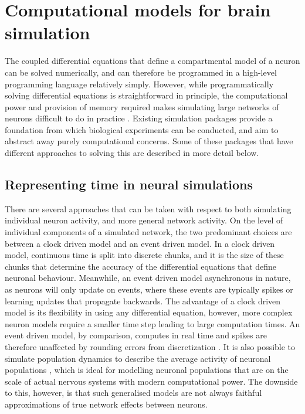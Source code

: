 

\section{Computational models for brain simulation}

The coupled differential equations that define a compartmental model of a neuron
can be solved numerically, and can therefore be programmed in a high-level
programming language relatively simply. However, while programmatically solving
differential equations is straightforward in principle, the computational power
and provision of memory required makes simulating large networks of neurons
difficult to do in practice \autocite{trappenberg_fundamentals_2009}. Existing
simulation packages provide a foundation from which biological experiments can
be conducted, and aim to abstract away purely computational concerns. Some of
these packages that have different approaches to solving this are described in
more detail below.

\subsection{Representing time in neural simulations}

There are several approaches that can be taken with respect to both simulating
individual neuron activity, and more general network activity. On the level of
individual components of a simulated network, the two predominant choices are
between a clock driven model and an event driven model. In a clock driven model,
continuous time is split into discrete chunks, and it is the size of these
chunks that determine the accuracy of the differential equations that define
neuronal behaviour. Meanwhile, an event driven model asynchronous in nature, as
neurons will only update on events, where these events are typically spikes or
learning updates that propagate backwards. The advantage of a clock driven model
is its flexibility in using any differential equation, however, more complex
neuron models require a smaller time step leading to large computation times. An
event driven model, by comparison, computes in real time and spikes are
therefore unaffected by rounding errors from discretization
\autocite{brette_simulation_2007}. It is also possible to simulate population
dynamics to describe the average activity of neuronal populations
\autocite{trappenberg_fundamentals_2009}, which is ideal for modelling neuronal
populations that are on the scale of actual nervous systems with modern
computational power. The downside to this, however, is that such generalised
models are not always faithful approximations of true network effects between neurons.

